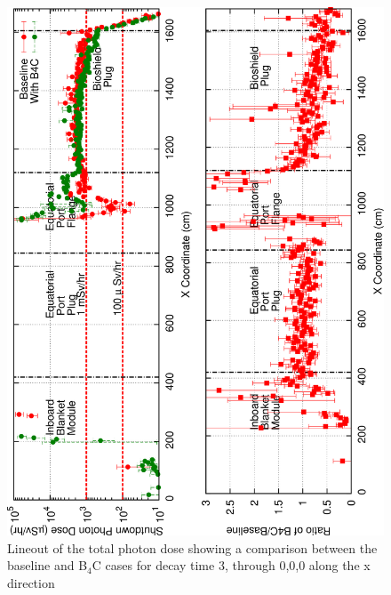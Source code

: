 \documentclass[12pt]{article}
\begin{document}
\begin{figure}[ht!]
\centering
\includegraphics[angle=-90,clip,scale=0.15]{../plots/photon_lineout/dc2_z0_lineout.png}
\caption{Lineout of the total photon dose showing a comparison between the baseline and B$_4$C cases for decay time 3,
         through 0,0,0 along the x direction}
\label{fig:photons_dc3_total_dose_lineout}
\end{figure}
\end{document}
